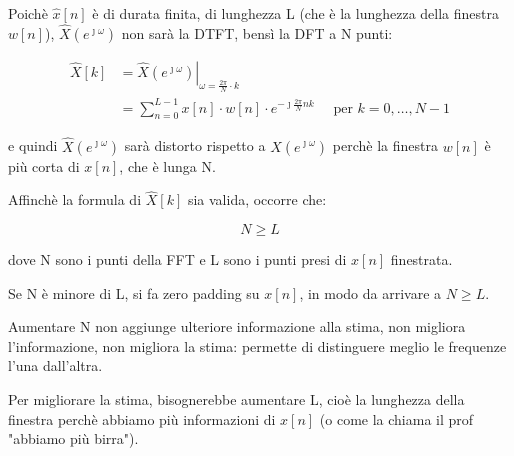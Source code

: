 \newpage 

Poichè $\hat{x} \left[ n\right]$ è di durata finita, di lunghezza L (che è la lunghezza della finestra $w \left[ n\right]$), $\hat{X} \left(e^{\jmath \omega}\right)$ non sarà la DTFT, bensì la DFT a N punti: 

{
    \Large 
    \begin{equation}
        \begin{split}
            \hat{X} \left[ k\right]
            &= 
            \left.
            \hat{X} \left(e^{\jmath \omega}\right)
            \right|_{\omega = \frac{2 \pi}{N} \cdot k}
            \\
            &= 
            \sum_{n = 0}^{L - 1} 
            x \left[ n\right]
            \cdot
            w \left[ n\right] 
            \cdot
            e^{-\jmath \frac{2\pi}{N} n k} 
            \quad 
            \text{ per }
            k = 0, \dots, N - 1
        \end{split}
    \end{equation}
}

e quindi $\hat{X} \left(e^{\jmath \omega}\right)$ sarà distorto rispetto a $X \left(e^{\jmath \omega}\right)$ perchè la finestra $w \left[ n\right]$ è più corta di $x \left[ n\right]$, che è lunga N. \newline 

Affinchè la formula di $\hat{X} \left[ k\right]$ sia valida, occorre che: 

{
    \Large 
    \begin{equation}
        N \geq L
    \end{equation}
}

dove N sono i punti della FFT e L sono i punti presi di $x \left[ n\right]$ finestrata. \newline 

Se N è minore di L, si fa zero padding su $x \left[ n\right]$, in modo da arrivare a $N \geq L$. \newline 

Aumentare N non aggiunge ulteriore informazione alla stima, non migliora l'informazione, non migliora la stima: permette di distinguere meglio le frequenze l'una dall'altra. \newline 

Per migliorare la stima, bisognerebbe aumentare L, cioè la lunghezza della finestra perchè abbiamo più informazioni di $x \left[ n\right]$ (o come la chiama il prof "abbiamo più birra"). \newline 

